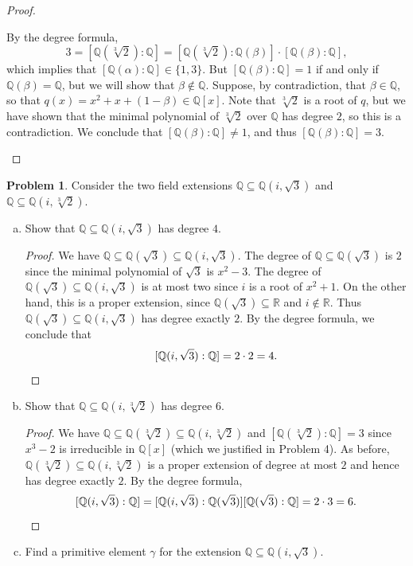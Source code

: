 \documentclass[11pt]{article}
\newcommand{\Q}{\mathbb{Q}}
\newcommand{\R}{\mathbb{R}}
\theoremstyle{definition}
\newtheorem{problem}{Problem}
\begin{document}
\begin{proof}
\begin{enumerate}[a)]
By the degree formula, 
$$3=[\Q(\sqrt[3]{2}):\Q]=[\Q(\sqrt[3]{2}):\Q(\beta)]\cdot[\Q(\beta):\Q],$$ 
which implies that $[\Q(\alpha):\Q]\in\{1,3\}$. But $[\Q(\beta):\Q]=1$ if and only if $\Q(\beta)=\Q$, but we will show that $\beta \notin\Q$. Suppose, by contradiction, that $\beta \in \Q$, so that $q(x) = x^2+x+(1-\beta) \in \Q[x]$. Note that $\sqrt[3]{2}$ is a root of $q$, but we have shown that the minimal polynomial of $\sqrt[3]{2}$ over $\Q$ has degree $2$, so this is a contradiction. We conclude that $[\Q(\beta):\Q] \neq 1$, and thus $[\Q(\beta):\Q]=3$.
\end{enumerate}
\end{proof}




\begin{problem}
Consider the two field extensions $\Q \subseteq \Q(i, \sqrt{3})$ and
$\Q \subseteq \Q(i, \sqrt[3]{2})$.

\begin{enumerate}[a)]
\item Show that $\Q \subseteq \Q(i, \sqrt{3})$ has degree $4$. 

\begin{proof} 
We have $\Q \subseteq \Q(\sqrt{3}) \subseteq \Q(i,  \sqrt{3})$.  The degree of $\Q \subseteq \Q(\sqrt{3})$ is $2$ since the minimal polynomial of $\sqrt{3}$ is $x^2 - 3$.
The degree of $\Q(\sqrt{3}) \subseteq \Q(i,  \sqrt{3})$ is at most two since $i$ is a root of $x^2 + 1$. On the other hand, this is a proper extension, since $\Q(\sqrt{3}) \subseteq \R$ and $i \notin \R$. Thus $\Q(\sqrt{3}) \subseteq \Q(i,  \sqrt{3})$ has degree exactly $2$. By the degree formula, we conclude that 
$$[\Q(i, \sqrt{3}): \Q] = 2 \cdot 2 = 4.\qedhere$$
\end{proof}

\item Show that $\Q \subseteq \Q(i, \sqrt[3]{2})$ has degree $6$.

\begin{proof}
We have $\Q \subseteq \Q(\sqrt[3]{2}) \subseteq \Q(i, \sqrt[3]{2})$ and $[\Q(\sqrt[3]{2}): \Q]  = 3$ since $x^3 - 2$ is irreducible in $\Q[x]$ (which we justified in Problem 4). As before, $\Q(\sqrt[3]{2}) \subseteq \Q(i, \sqrt[3]{2})$ is a proper extension of
    degree at most $2$ and hence has degree exactly $2$. By the degree formula,
    $$[\Q(i, \sqrt{3}): \Q] = [\Q(i, \sqrt{3}): \Q(\sqrt{3})] [\Q(\sqrt{3}): \Q] = 2 \cdot 3 = 6.\qedhere$$ 
  \end{proof}
  
  
\item Find a primitive element $\gamma$ for the extension $\Q \subseteq \Q(i, \sqrt{3})$.


\end{enumerate}
\end{problem}
\end{document}
